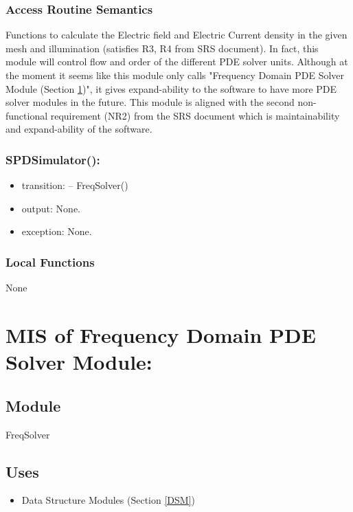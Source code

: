 \documentclass[12pt, titlepage]{article}
\begin{document}
\subsubsection{Access Routine Semantics}
Functions to calculate the Electric field and Electric Current
density in the given mesh and illumination (satisfies R3, R4 from SRS document). In fact, this module will control flow and order of the different PDE solver units. Although at the moment it seems like this module  only calls "Frequency Domain PDE Solver Module (Section \ref{FDSM})", it gives expand-ability to the software to have more PDE solver modules in the future. This module is aligned with the second non-functional requirement (NR2) from the SRS document which is maintainability and expand-ability of the software.

\subsubsection*{SPDSimulator():}
\begin{itemize}
	\item transition:
	\subitem -- FreqSolver() 
	\item output: None. 
	\item exception: None.
\end{itemize}

\subsubsection{Local Functions}
None



\newpage
%
%
%
%
\section{MIS of Frequency Domain PDE Solver Module:} \label{FDSM} 


\subsection{Module}
FreqSolver


\subsection{Uses}
\begin{itemize}
	\item Data Structure Modules (Section \ref{DSM})
\end{itemize}
\end{document}
